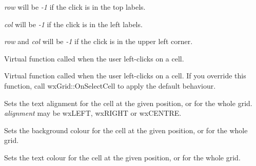 {\it row} will be {\it -1} if the click is in the top labels.

{\it col} will be {\it -1} if the click is in the left labels.

{\it row} and {\it col} will be {\it -1} if the click is in the upper
left corner.



Virtual function called when the user left-clicks on a cell.



Virtual function called when the user left-clicks on a cell. If you override this function,
call wxGrid::OnSelectCell to apply the default behaviour.




Sets the text alignment for the cell at the given position, or for the whole grid. {\it alignment} may be wxLEFT, wxRIGHT or wxCENTRE.




Sets the background colour for the cell at the given position, or for the whole grid.




Sets the text colour for the cell at the given position, or for the whole grid.



